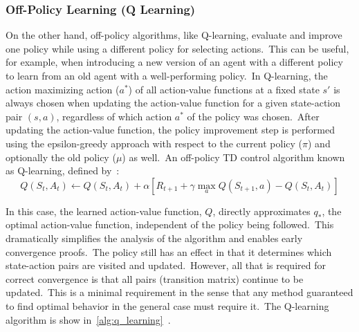 \documentclass[../xlapes02]{subfiles}
\begin{document}
    \subsubsection{Off-Policy Learning (Q Learning)}\label{subsubsec:td-q-learning}
    On the other hand, off-policy algorithms, like Q-learning, evaluate and improve one policy while using a different policy for selecting actions.\ This can be useful, for example, when introducing a new version of an agent with a different policy to learn from an old agent with a well-performing policy.\ In Q-learning, the action maximizing action ($ a^* $) of all action-value functions at a fixed state $ s' $ is always chosen when updating the action-value function for a given state-action pair $ (s, a) $, regardless of which action $ a^* $ of the policy was chosen.\ After updating the action-value function, the policy improvement step is performed using the epsilon-greedy approach with respect to the current policy ($ \pi $) and optionally the old policy ($ \mu $) as well.\ An off-policy TD control algorithm known as Q-learning, defined by~\cite{FITMT25127, sutton2018reinforcement}:
    \begin{equation}
        \label{eq:q-learning}
        Q(S_t,A_t)\leftarrow Q(S_t,A_t)+\alpha\left[R_{t+1}+\gamma\max_a Q(S_{t+1},a)-Q(S_t,A_t)\right]
    \end{equation}

    In this case, the learned action-value function, $Q$, directly approximates $q_*$, the optimal action-value function, independent of the policy being followed.\ This dramatically simplifies the analysis of the algorithm and enables early convergence proofs.\ The policy still has an effect in that it determines which state-action pairs are visited and updated.\ However, all that is required for correct convergence is that all pairs (transition matrix) continue to be updated.\ This is a minimal requirement in the sense that any method guaranteed to find optimal behavior in the general case must require it.\ The Q-learning algorithm is show in~\cref{alg:q_learning}~\cite{rl-course-david-silver, sutton2018reinforcement}.

\end{document}
